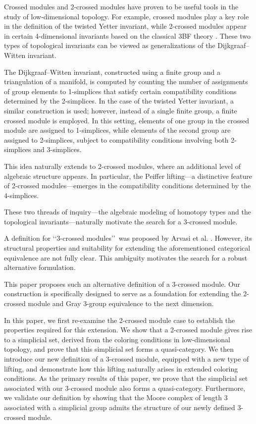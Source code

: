 \documentclass{tac}
\begin{document}
Crossed modules and 2-crossed modules have proven to be useful tools in the study of low-dimensional topology. For example, crossed modules play a key role in the definition of the twisted Yetter invariant, while 2-crossed modules appear in certain 4-dimensional invariants based on the classical 3BF theory \cite{RadenkovicVojinovic2022}. These two types of topological invariants can be viewed as generalizations of the Dijkgraaf–Witten invariant.

The Dijkgraaf–Witten invariant, constructed using a finite group and a triangulation of a manifold, is computed by counting the number of assignments of group elements to 1-simplices that satisfy certain compatibility conditions determined by the 2-simplices. In the case of the twisted Yetter invariant, a similar construction is used; however, instead of a single finite group, a finite crossed module is employed. In this setting, elements of one group in the crossed module are assigned to 1-simplices, while elements of the second group are assigned to 2-simplices, subject to compatibility conditions involving both 2-simplices and 3-simplices.

This idea naturally extends to 2-crossed modules, where an additional level of algebraic structure appears. In particular, the Peiffer lifting—a distinctive feature of 2-crossed modules—emerges in the compatibility conditions determined by the 4-simplices.

These two threads of inquiry—the algebraic modeling of homotopy types and the topological invariants—naturally motivate the search for a 3-crossed module.

A definition for \lq\lq3-crossed modules\rq\rq\ was proposed by Arvasi et al. \cite{Arvasi2009}. However, its structural properties and suitability for extending the aforementioned categorical equivalence \cite{SarikayaUlualan2024} are not fully clear. This ambiguity motivates the search for a robust alternative formulation.

This paper proposes such an alternative definition of a 3-crossed module. Our construction is specifically designed to serve as a foundation for extending the 2-crossed module and Gray 3-group equivalence to the next dimension.

In this paper, we first re-examine the 2-crossed module case to establish the properties required for this extension. We show that a 2-crossed module gives rise to a simplicial set, derived from the coloring conditions in low-dimensional topology, and prove that this simplicial set forms a quasi-category. We then introduce our new definition of a 3-crossed module, equipped with a new type of lifting, and demonstrate how this lifting naturally arises in extended coloring conditions. As the primary results of this paper, we prove that the simplicial set associated with our 3-crossed module also forms a quasi-category. Furthermore, we validate our definition by showing that the Moore complex of length 3 associated with a simplicial group admits the structure of our newly defined 3-crossed module.
\end{document}
